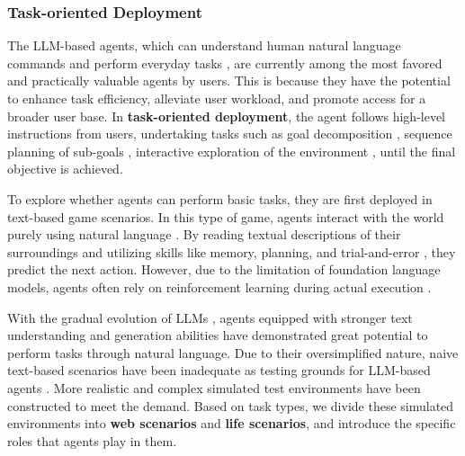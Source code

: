 \subsubsection{Task-oriented Deployment}\label{sec:Task-Oriented Deployment}
The LLM-based agents, which can understand human natural language commands and perform everyday tasks \cite{DBLP:journals/corr/abs-2307-13854}, are currently among the most favored and practically valuable agents by users. This is because they have the potential to enhance task efficiency, alleviate user workload, and promote access for a broader user base. In \textbf{task-oriented deployment}, the agent follows high-level instructions from users, undertaking tasks such as goal decomposition \cite{DBLP:journals/corr/abs-2305-02412, DBLP:conf/icml/HuangAPM22, DBLP:journals/corr/abs-2307-12856, DBLP:journals/corr/abs-2306-07863}, sequence planning of sub-goals \cite{DBLP:journals/corr/abs-2305-02412, DBLP:journals/corr/abs-2308-01552}, interactive exploration of the environment \cite{DBLP:journals/corr/abs-2211-09935, DBLP:journals/corr/abs-2307-13854, DBLP:journals/corr/abs-2305-11854, DBLP:conf/nips/Yao0YN22}, until the final objective is achieved.

To explore whether agents can perform basic tasks, they are first deployed in text-based game scenarios. In this type of game, agents interact with the world purely using natural language \cite{DBLP:journals/corr/abs-2012-02757}. By reading textual descriptions of their surroundings and utilizing skills like memory, planning, and trial-and-error \cite{DBLP:journals/corr/abs-2305-02412}, they predict the next action. However, due to the limitation of foundation language models, agents often rely on reinforcement learning during actual execution \cite{DBLP:journals/corr/abs-2012-02757, DBLP:conf/atal/SinghSM22, DBLP:conf/naacl/AmmanabroluULSR21}.

With the gradual evolution of LLMs \cite{chatgpt2022}, agents equipped with stronger text understanding and generation abilities have demonstrated great potential to perform tasks through natural language. Due to their oversimplified nature, naive text-based scenarios have been inadequate as testing grounds for LLM-based agents \cite{DBLP:journals/corr/abs-2307-13854}. More realistic and complex simulated test environments have been constructed to meet the demand. Based on task types, we divide these simulated environments into \textbf{web scenarios} and \textbf{life scenarios}, and introduce the specific roles that agents play in them.

